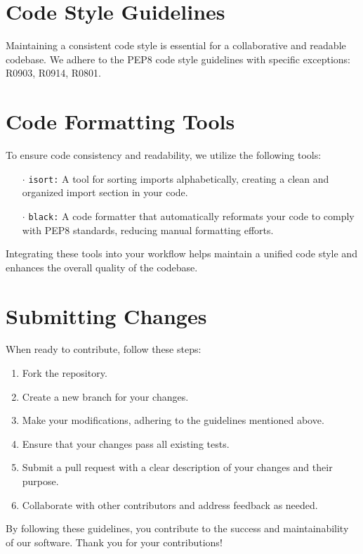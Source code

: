 \documentclass{report}
\begin{document}
\section{Code Style Guidelines}

Maintaining a consistent code style is essential for a collaborative and readable codebase. We adhere to the PEP8 code style guidelines with specific exceptions: R0903, R0914, R0801.

\section{Code Formatting Tools}

To ensure code consistency and readability, we utilize the following tools:

\begin{itemize}
    \item[$\cdot$] \texttt{isort:} A tool for sorting imports alphabetically, creating a clean and organized import section in your code.
    \item[$\cdot$] \texttt{black:} A code formatter that automatically reformats your code to comply with PEP8 standards, reducing manual formatting efforts.
\end{itemize}

Integrating these tools into your workflow helps maintain a unified code style and enhances the overall quality of the codebase.

\section{Submitting Changes}

When ready to contribute, follow these steps:

\begin{enumerate}
    \item Fork the repository.
    \item Create a new branch for your changes.
    \item Make your modifications, adhering to the guidelines mentioned above.
    \item Ensure that your changes pass all existing tests.
    \item Submit a pull request with a clear description of your changes and their purpose.
    \item Collaborate with other contributors and address feedback as needed.
\end{enumerate}

By following these guidelines, you contribute to the success and maintainability of our software. Thank you for your contributions!
\end{document}
